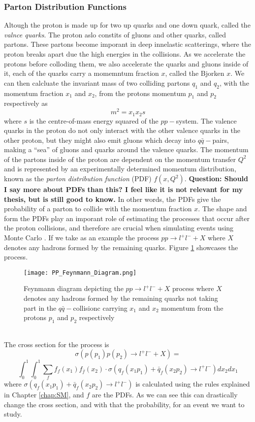 \documentclass[14pt, a4paper]{book}
\begin{document}
\subsubsection{Parton Distribution Functions}
Altough the proton is made up for two up quarks and one down quark, called the \textit{valnce quarks}. The proton aslo constits of gluons and other quarks, called partons. These partons become imporant in deep innelastic scatterings, 
where the proton breaks apart due the high energies in the collisions. As we accelerate the protons before colloding them, we also accelerate the quarks and gluons inside of it, each of the quarks carry a momemntum fraction $x$, 
called the Bjorken $x$. We can then calcluate the invariant mass of two colliding partons $q_1$ and $q_2$, with the momentum fraction $x_1$ and $x_2$, from the protons momentum $p_1$ and $p_2$ respectively as
$$
m^2=x_1x_2s
$$
where $s$ is the centre-of-mass energy squared of the $pp-$system. The valence quarks in the proton do not only interact with the other valence quarks in the other proton, but they might also emit gluons which decay into $q\bar{q}-$pairs, 
making a “sea” of gluons and quarks around the valence quarks. The momentum of the partons inside of the proton are dependent on the momentum transfer $Q^2$ and is represented by an experimentally determined momentum distribution, 
known as the \textit{parton distribution function} (PDF) \cite{PDF} $f(x,Q^2)$. \textbf{Question: Should I say more about PDFs than this? I feel like it is not relevant for my thesis, but is still good to know.} In other words, the PDFs give the probability of a parton to collide with the momentum fraction $x$. The shape and form the PDFs play 
an imporant role of estimating the processes that occur after the proton collisions, and therefore are crucial when simulating events using Monte Carlo \cite{MC_PDF}.  If we take as an example the process 
$pp\rightarrow l^+l^-+X$ where $X$ denotes any hadrons formed by the remaining quarks. Figure \ref{fig:Feynann_PDF} showcases the process.
\begin{figure}[!ht]
    \centering
    \texttt{[image: PP\_Feynmann\_Diagram.png]}
    \caption[Feynam diagram from $pp-$collision]{Feynmann diagram depicting the $pp\rightarrow l^+l^-+X$ process where $X$ denotes any hadrons formed by the remaining quarks
    not taking part in the $q\bar{q}-$collisionc carrying $x_1$ and $x_2$ momentum from the protons $p_1$ and $p_2$ respectively}\label{fig:Feynann_PDF}
\end{figure}
\\The cross section for the process is 
$$
\sigma\left(p(p_1) p(p_2)\rightarrow l^+l^- +X\right)=
$$
\begin{equation}\label{eq:PDF_xsec}
    \int_{0}^{1}\int_{0}^{1}\sum_{f}f_f(x_1)f_{\bar{f}}(x_2)\cdot\sigma\left(q_f(x_1p_1)+\bar{q}_f(x_2p_2)\rightarrow l^+l^- \right) dx_2dx_1
\end{equation}
where $\sigma\left(q_f(x_1p_1)+\bar{q}_f(x_2p_2)\rightarrow l^+l^- \right)$ is calculated using the rules explained in Chapter \ref{chap:SM}, and $f$ are the PDFs. As we can see this can drastically change the cross section, and with that the 
probability, for an event we want to study. 
\end{document}
